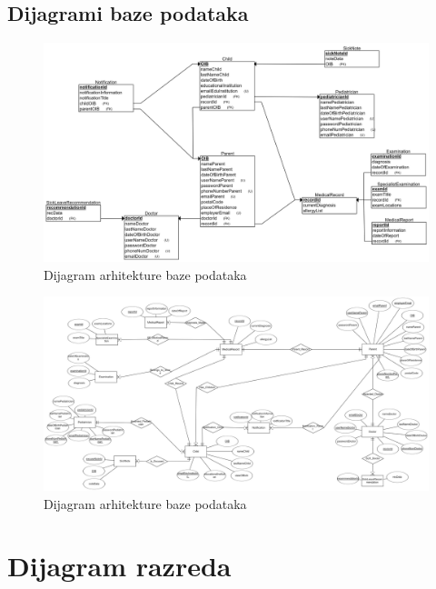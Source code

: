 			\subsection{Dijagrami baze podataka}
				\begin{figure}[H]
					\includegraphics[scale=0.1]{dijagrami/ozdraviER.PNG} %
					\centering
					\caption{Dijagram arhitekture baze podataka}
					\label{fig:arhitektura-baze1}
				\end{figure}
				
				\begin{figure}[H]
					\includegraphics[scale=0.07]{dijagrami/ozdraviREL.PNG} %
					\centering
					\caption{Dijagram arhitekture baze podataka}
					\label{fig:arhitektura-baze2}
				\end{figure}
				\clearpage
			\eject
			
		\section{Dijagram razreda}
		
